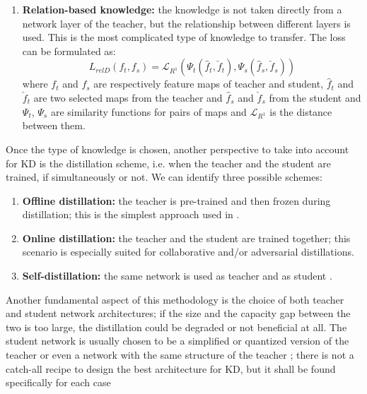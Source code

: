 \begin{enumerate}
    \item \textbf{Relation-based knowledge:} the knowledge is not taken directly from a network layer of the teacher, but the relationship between different layers is used.
    This is the most complicated type of knowledge to transfer.
    The loss can be formulated as:
    \begin{equation}
        L_{relD}(f_t, f_s) = \mathcal{L}_{R^1}(\Psi_t(\hat{f}_t, \check{f}_t), \Psi_s(\hat{f}_s, \check{f}_s))
        \label{eqn:relation_based_kd_loss}
    \end{equation}
    where $f_t$ and $f_s$ are respectively feature maps of teacher and student, $\hat{f}_t$ and $\check{f}_t$ are two selected maps from the teacher and $\hat{f}_s$ and $\check{f}_s$ from the student and $\Psi_t$, $\Psi_s$ are similarity functions for pairs of maps and $\mathcal{L}_{R^1}$ is the distance between them.
\end{enumerate}

Once the type of knowledge is chosen, another perspective to take into account for KD is the distillation scheme, i.e. when the teacher and the student are trained, if simultaneously or not.
We can identify three possible schemes:
\begin{enumerate}
    \item \textbf{Offline distillation:} the teacher is pre-trained and then frozen during distillation; this is the simplest approach used in \cite{hinton2015distilling}.
    \item \textbf{Online distillation:} the teacher and the student are trained together; this scenario is especially suited for collaborative \cite{zhang2018deep} and/or adversarial \cite{zhang2021adversarial} distillations.
    \item \textbf{Self-distillation:} the same network is used as teacher and as student \cite{zhang2019your}.
\end{enumerate}

Another fundamental aspect of this methodology is the choice of both teacher and student network architectures; if the size and the capacity gap between the two is too large, the distillation could be degraded or not beneficial at all.
The student network is usually chosen to be a simplified or quantized version of the teacher or even a network with the same structure of the teacher \cite{gou2021knowledge}; there is not a catch-all recipe to design the best architecture for KD, but it shall be found specifically for each case

